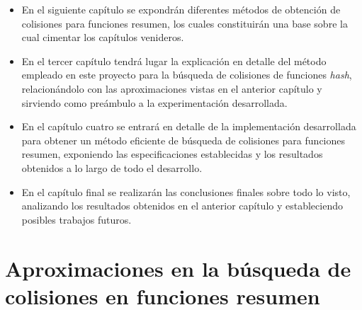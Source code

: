 \documentclass[12pt,spanish,listoffigures,listoftables,listofalgorithms]{tfgetsinf}
\newcommand{\hash}{\textit{hash}}
\begin{document}
\begin{itemize}

	\item En el siguiente capítulo se expondrán diferentes métodos de obtención de colisiones para funciones resumen, los cuales constituirán una base sobre la cual cimentar los capítulos venideros.

	\item En el tercer capítulo tendrá lugar la explicación en detalle del método empleado en este proyecto para la búsqueda de colisiones de funciones \hash, relacionándolo con las aproximaciones vistas en el anterior capítulo y sirviendo como preámbulo a la experimentación desarrollada.

	\item En el capítulo cuatro se entrará en detalle de la implementación desarrollada para obtener un método eficiente de búsqueda de colisiones para funciones resumen, exponiendo las especificaciones establecidas y los resultados obtenidos a lo largo de todo el desarrollo.

	\item En el capítulo final se realizarán las conclusiones finales sobre todo lo visto, analizando los resultados obtenidos en el anterior capítulo y estableciendo posibles trabajos futuros.

\end{itemize}

%


\chapter{Aproximaciones en la búsqueda de colisiones en funciones resumen}
\end{document}
